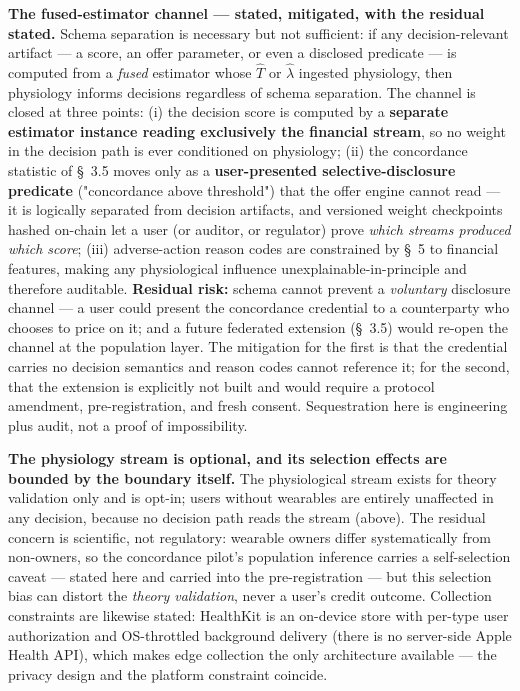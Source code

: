 \documentclass[11pt,twocolumn]{article}
\begin{document}
\textbf{The fused-estimator channel --- stated, mitigated, with the residual stated.} Schema separation is necessary but not sufficient: if any decision-relevant artifact --- a score, an offer parameter, or even a disclosed predicate --- is computed from a \emph{fused} estimator whose $\hat{T}$ or $\hat{\lambda}$ ingested physiology, then physiology informs decisions regardless of schema separation. The channel is closed at three points: (i) the decision score is computed by a \textbf{separate estimator instance reading exclusively the financial stream}, so no weight in the decision path is ever conditioned on physiology; (ii) the concordance statistic of \S~3.5 moves only as a \textbf{user-presented selective-disclosure predicate} ("concordance above threshold") that the offer engine cannot read --- it is logically separated from decision artifacts, and versioned weight checkpoints hashed on-chain let a user (or auditor, or regulator) prove \emph{which streams produced which score}; (iii) adverse-action reason codes are constrained by \S~5 to financial features, making any physiological influence unexplainable-in-principle and therefore auditable. \textbf{Residual risk:} schema cannot prevent a \emph{voluntary} disclosure channel --- a user could present the concordance credential to a counterparty who chooses to price on it; and a future federated extension (\S~3.5) would re-open the channel at the population layer. The mitigation for the first is that the credential carries no decision semantics and reason codes cannot reference it; for the second, that the extension is explicitly not built and would require a protocol amendment, pre-registration, and fresh consent. Sequestration here is engineering plus audit, not a proof of impossibility.

\textbf{The physiology stream is optional, and its selection effects are bounded by the boundary itself.} The physiological stream exists for theory validation only and is opt-in; users without wearables are entirely unaffected in any decision, because no decision path reads the stream (above). The residual concern is scientific, not regulatory: wearable owners differ systematically from non-owners, so the concordance pilot's population inference carries a self-selection caveat --- stated here and carried into the pre-registration --- but this selection bias can distort the \emph{theory validation}, never a user's credit outcome. Collection constraints are likewise stated: HealthKit is an on-device store with per-type user authorization and OS-throttled background delivery (there is no server-side Apple Health API), which makes edge collection the only architecture available --- the privacy design and the platform constraint coincide.
\end{document}
